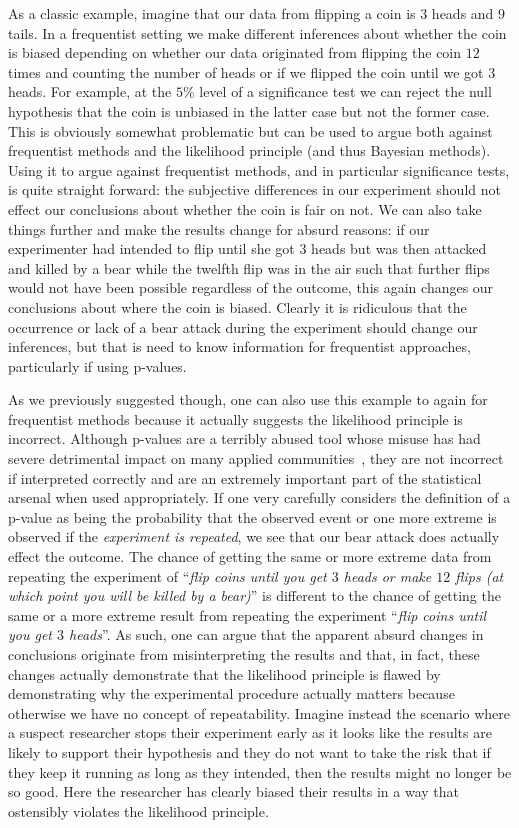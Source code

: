 As a classic example, 
imagine that our data from flipping a coin is $3$ heads and $9$ tails.
In a frequentist setting we make different inferences about whether the coin is biased 
depending on whether our data originated from flipping the coin $12$ times and counting the number of heads or if we 
flipped the coin until we got $3$ heads.  For example, at the $5\%$ level of a significance test we can reject the null
hypothesis that the coin is unbiased in the latter case but not the former case.  This is obviously somewhat problematic but
can be used to argue both against frequentist methods and the likelihood principle (and thus Bayesian methods).  Using it
to argue against frequentist methods, and in particular significance tests, is quite straight forward: the subjective
differences in our experiment should not effect our conclusions about whether the coin is fair on not.  We can also take things
further and make the results change for absurd reasons: if our experimenter had intended to flip until she got
$3$ heads but was then attacked and killed by a bear while the twelfth flip was in the air such that further flips would not
have been possible regardless of the outcome, this again changes our conclusions
about where the coin is biased.  Clearly it is ridiculous that the occurrence or lack of a bear attack during the experiment
should change our inferences, but that is need to know information for frequentist approaches, particularly if using p-values.

As we previously suggested though, one can also use this example to again for frequentist methods because it actually
suggests the likelihood principle is incorrect.  Although p-values are a terribly abused tool whose misuse has had
severe detrimental impact on many applied communities~\citep{goodman1999toward,ioannidis2005most}, they are not incorrect if 
interpreted correctly
and are an extremely important part of the statistical arsenal when used appropriately.  If one very carefully considers
the definition of a p-value as being the probability that the observed event or one more extreme is observed if the
\emph{experiment is repeated}, we see that our bear attack does actually effect the outcome.  The chance of getting the same
or more extreme data from repeating the experiment of ``\textit{flip coins until you get $3$ heads or make $12$ flips (at which
	point you will be killed by a bear)}'' is different to the chance of getting the same or a more extreme result from
repeating the experiment ``\textit{flip coins until you get $3$ heads}''.  As such, one can argue that the apparent absurd
changes in conclusions originate from misinterpreting the results and that, in fact, these changes actually demonstrate
that the likelihood principle is flawed by demonstrating why the experimental procedure actually matters because otherwise
we have no concept of repeatability.  Imagine instead the scenario where a suspect researcher stops their experiment
early as it looks like the results are likely to support their hypothesis and they do not want to take the risk that if they
keep it running as long as they intended, then the results might no longer be so good.  Here the researcher has clearly
biased their results in a way that ostensibly violates the likelihood principle.

